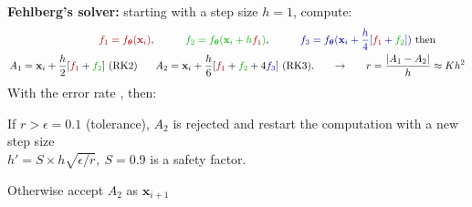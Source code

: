 \documentclass[landscape,a0paper,fontscale=0.285]{baposter} %
\newcommand{\compresslist}{ %
\setlength{\itemsep}{1pt}
\setlength{\parskip}{0pt}
\setlength{\parsep}{0pt}
}
\newcommand{\fa}{{\color{f1}f_1}}
\newcommand{\fb}{{\color{f2}f_2}}
\newcommand{\fc}{{\color{f3}f_3}}
\newcommand{\x}{\ensuremath{\mathbf{x}}} %
\newcommand{\eps}{\ensuremath{\epsilon}}
\newcommand{\params}{\ensuremath{\boldsymbol{\theta}}}
\newcommand{\nnet}{\ensuremath{f_{\params}}}
\begin{document}
\begin{poster}
{   {\bf\color{bleutitre} Fehlberg's solver:} starting with a step size $h=1$, compute:
    \begin{align*}
      {\color{f1} \fa = \nnet(\x_i)},\phantom{xxxxx} 
      {\color{f2} \fb = \nnet(\x_i+h\fa)}, \phantom{xxxxx} 
      {\color{f3} \fc = \nnet(\x_i+\frac{h}{4}[\fa+\fb])}\text{ then} \phantom{xxxxx} \\
      A_1 = \x_i+\frac{h}{2}[\fa+\fb] \text{ (RK2)}  \phantom{xxx} A_2 = \x_i+\frac{h}{6}[\fa+\fb+4\fc] \text{ (RK3).} 
      \phantom{xxx}
      \rightarrow
      \phantom{xxx}
      r = \frac{|A_1-A_2|}{h} \approx Kh^2
    \end{align*}
   With the error rate $  $, then:
   \begin{citemize}\compresslist
   \item If $r > \eps=0.1$ (tolerance), $A_2$ is rejected and restart the computation with a new
     step size\\ $h'= S \times h\sqrt{\epsilon/r},\ S=0.9$ is a safety
     factor.
   \item Otherwise accept $A_2$ as ${\x}_{i+1}$
   \end{citemize}
   ~~
}




\end{poster}
\end{document}
